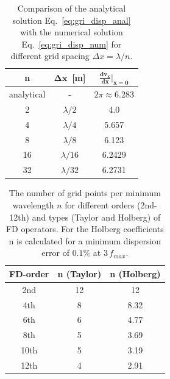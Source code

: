 \begin{table}[hbt]
\caption{\label{grid_disp.1} Comparison of the analytical solution Eq.~\ref{eq:gri_disp_anal} with the numerical solution Eq.~\ref{eq:gri_disp_num} for different grid spacing $\Delta x = \lambda /n$.}
\centering
\begin{tabular}{c|c|c}
    \textbf{n} &  \textbf{$\mathbf{\Delta x}\,$ [m]} & \textbf{$\mathbf{\frac{d v_x}{d x}|_{x=0}}$} \\ \hline 
    analytical & - & $2\pi \approx 6.283$ \\ 
    2 & $\lambda/2$ & 4.0 \\ 
    4 & $\lambda/4$ & 5.657 \\ 
    8 & $\lambda/8$ & 6.123 \\ 
    16 & $\lambda/16$ & 6.2429 \\ 
    32 & $\lambda/32$ & 6.2731
\end{tabular}
\end{table}
 
\begin{table}[hbt]
\caption{\label{grid_disp.2} The number of grid points per minimum wavelength $n$ for different orders (2nd-12th) and types (Taylor and Holberg) of FD operators. For the Holberg coefficients n is calculated for a minimum dispersion error of $0.1\%$ at $3\,f_{max}$.}
\centering
\begin{tabular}{c|c|c}
    \textbf{FD-order} & \textbf{n (Taylor)} & \textbf{n (Holberg)} \\ \hline 
    2nd   &   12       &  12         \\
    4th   &   8        &  8.32       \\
    6th   &   6        &  4.77       \\
    8th   &   5        &  3.69       \\ 
    10th  &   5        &  3.19       \\
    12th  &   4        &  2.91       
\end{tabular}
\end{table} 

